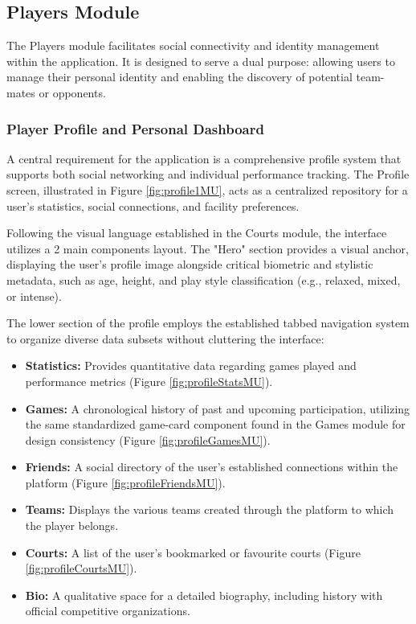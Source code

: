 \subsection{Players Module}
\label{subsec:rp-players}

The Players module facilitates social connectivity and identity management within the application. 
It is designed to serve a dual purpose: allowing users to manage their personal identity and enabling the discovery of potential team-mates or opponents.

\subsubsection{Player Profile and Personal Dashboard}

A central requirement for the application is a comprehensive profile system that supports both social networking and individual performance tracking.
The Profile screen, illustrated in Figure \ref{fig:profile1MU}, acts as a centralized repository for a user's statistics, social connections, and facility preferences.

Following the visual language established in the Courts module, the interface utilizes a 2 main components layout. The "Hero" section provides a visual anchor, displaying the user's profile image alongside critical biometric and stylistic metadata, such as age, height, and play style classification (e.g., relaxed, mixed, or intense).

The lower section of the profile employs the established tabbed navigation system to organize diverse data subsets without cluttering the interface:
\begin{itemize}
	\item \textbf{Statistics:} Provides quantitative data regarding games played and performance metrics (Figure \ref{fig:profileStatsMU}).
	\item \textbf{Games:} A chronological history of past and upcoming participation, utilizing the same standardized game-card component found in the Games module for design consistency (Figure \ref{fig:profileGamesMU}).
	\item \textbf{Friends:} A social directory of the user's established connections within the platform (Figure \ref{fig:profileFriendsMU}).
	\item \textbf{Teams:} Displays the various teams created through the platform to which the player belongs.
	\item \textbf{Courts:} A list of the user’s bookmarked or favourite courts (Figure \ref{fig:profileCourtsMU}).
	\item \textbf{Bio:} A qualitative space for a detailed biography, including history with official competitive organizations.
\end{itemize}

